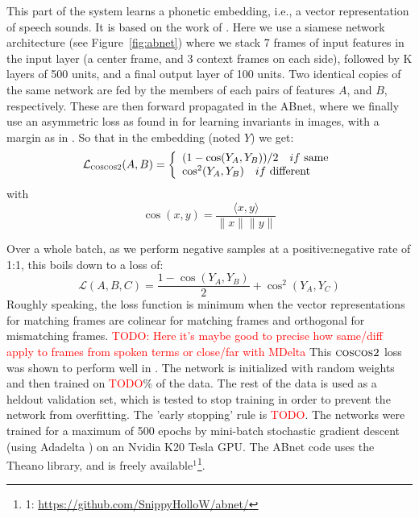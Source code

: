 \documentclass[a4paper]{article}
\begin{document}
This part of the system learns a phonetic embedding, i.e., a vector representation of speech sounds. It is based on the work of \cite{synnaeve&dupoux2014}. Here we use a siamese network architecture \cite{siamese} (see Figure~\ref{fig:abnet}) where we stack 7 frames of input features in the input layer (a center frame, and 3 context frames on each side), followed by K layers of 500 units, and a final output layer of 100 units. Two identical copies of the same network are fed by the members of each pairs of features $A$, and $B$, respectively. %
These are then forward propagated in the ABnet, where we finally use an asymmetric loss as found in \cite{drlim} for learning invariants in images, with a margin as in \cite{wsabie}. So that in the embedding (noted $Y$) we get:
\begin{eqnarray*}
    \mathcal{L}_{\textsc{coscos2}}(A,B) = \left\{
        \begin{array}{l}
              (1-\cos(Y_A, Y_B)) / 2 \ \ \ if\ \mathrm{same}\\
                \cos^2(Y_A, Y_B)\ \ \ if\ \mathrm{different}
            \end{array}\right.
        \end{eqnarray*}
        with $$\cos(x, y) = \frac{\langle x, y \rangle}{\|x\|\|y\|}$$


Over a whole batch, as we perform negative samples at a positive:negative rate of 1:1, this boils down to a loss of:
$$\mathcal{L}(A,B,C) = \frac{1 - \cos(Y_A, Y_B)}{2} + \cos^2(Y_A, Y_{C})$$
Roughly speaking, the loss function is minimum when the vector representations for matching frames are colinear for matching frames and orthogonal for mismatching frames. \textcolor{red}{TODO: Here it's maybe good to precise how same/diff apply to frames from spoken terms or close/far with MDelta} This $\textsc{coscos2}$ loss was shown to perform well in \cite{synnaeve}. The network is initialized with random weights and then trained on \textcolor{red}{TODO}\% of the data. The rest of the data is used as a heldout validation set, which is tested to stop training in order to prevent the network from overfitting. The  'early stopping' rule is \textcolor{red}{TODO}. The networks were trained for a maximum of 500 epochs by mini-batch stochastic gradient descent (using Adadelta \cite{adadelta}) on an Nvidia K20 Tesla GPU. The ABnet code uses the Theano library\cite{theano2010,theano2012}, and is freely available$^1$\footnote{1: \url{https://github.com/SnippyHolloW/abnet/}}.
\end{document}
